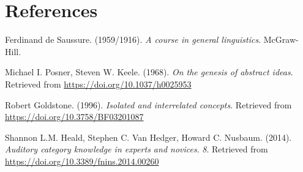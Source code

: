 \documentclass[
  man]{apa6}
\newlength{\cslhangindent}
\newlength{\cslentryspacingunit} %
\newenvironment{CSLReferences}[2] %
 {%
  \setlength{\parindent}{0pt}
  \ifodd #1
  \let\oldpar\par
  \def\par{\hangindent=\cslhangindent\oldpar}
  \fi
  \setlength{\parskip}{#2\cslentryspacingunit}
 }%
 {}
\begin{document}
\hypertarget{references}{%
\section{References}\label{references}}

\hypertarget{refs}{}
\begin{CSLReferences}{1}{0}
\leavevmode{}%
Ferdinand de Saussure. (1959/1916). \emph{A course in general linguistics}. McGraw-Hill.

\leavevmode{}%
Michael I. Posner, Steven W. Keele. (1968). \emph{On the genesis of abstract ideas}. Retrieved from \url{https://doi.org/10.1037/h0025953}

\leavevmode{}%
Robert Goldstone. (1996). \emph{Isolated and interrelated concepts}. Retrieved from \url{https://doi.org/10.3758/BF03201087}

\leavevmode{}%
Shannon L.M. Heald, Stephen C. Van Hedger, Howard C. Nusbaum. (2014). \emph{Auditory category knowledge in experts and novices}. \emph{8}. Retrieved from \url{https://doi.org/10.3389/fnins.2014.00260}

\end{CSLReferences}
\end{document}
